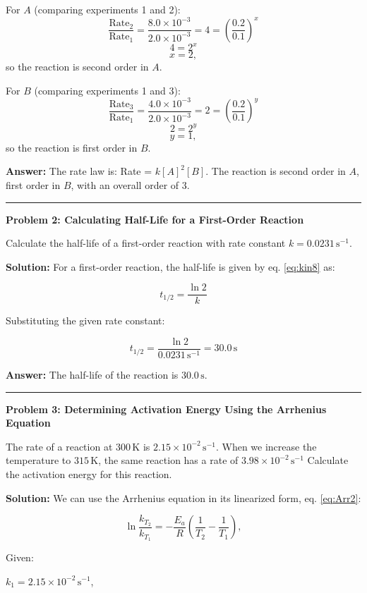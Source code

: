 \documentclass[
  9pt,
]{extbook}
\theoremstyle{definition}
\theoremstyle{definition}
\theoremstyle{definition}
\theoremstyle{remark}
\begin{document}
For \(A\) (comparing experiments 1 and 2):
\[\frac{\text{Rate}_2}{\text{Rate}_1} = \frac{8.0 \times 10^{-3}}{2.0 \times 10^{-3}} = 4 = \left(\frac{0.2}{0.1}\right)^x\]
\[4 = 2^x\]
\[x = 2,\]
so the reaction is second order in \(A\).

For \(B\) (comparing experiments 1 and 3):
\[\frac{\text{Rate}_3}{\text{Rate}_1} = \frac{4.0 \times 10^{-3}}{2.0 \times 10^{-3}} = 2 = \left(\frac{0.2}{0.1}\right)^y\]
\[2 = 2^y\]
\[y = 1,\]
so the reaction is first order in \(B\).

\textbf{Answer:} The rate law is: Rate = \(k[A]^2[B]\). The reaction is second order in \(A\), first order in \(B\), with an overall order of 3.

\begin{center}\rule{0.5\linewidth}{0.5pt}\end{center}

\textbf{Problem 2: Calculating Half-Life for a First-Order Reaction}

Calculate the half-life of a first-order reaction with rate constant \(k = 0.0231\,\text{s}^{-1}\).

\textbf{Solution:} For a first-order reaction, the half-life is given by eq. \eqref{eq:kin8} as:

\[t_{1/2} = \frac{\ln 2}{k}\]

Substituting the given rate constant:

\[t_{1/2} = \frac{\ln 2}{0.0231\,\text{s}^{-1}} = 30.0\,\text{s}\]

\textbf{Answer:} The half-life of the reaction is \(30.0\,\text{s}\).

\begin{center}\rule{0.5\linewidth}{0.5pt}\end{center}

\textbf{Problem 3: Determining Activation Energy Using the Arrhenius Equation}

The rate of a reaction at \(300\,\text{K}\) is
\(2.15 \times 10^{-2}\,\text{s}^{-1}\). When we increase the temperature to \(315\,\text{K}\), the same reaction has a rate of \(3.98 \times 10^{-2}\,\text{s}^{-1}\) Calculate the activation energy for this reaction.

\textbf{Solution:} We can use the Arrhenius equation in its linearized form, eq. \eqref{eq:Arr2}:

\[\ln \frac{k_{T_2}}{k_{T_1}}=-\frac{E_a}{R}\left(\frac{1}{T_2}-\frac{1}{T_1}\right),
\]

Given:

\(k_1 = 2.15 \times 10^{-2}\,\text{s}^{-1}\),
\end{document}
